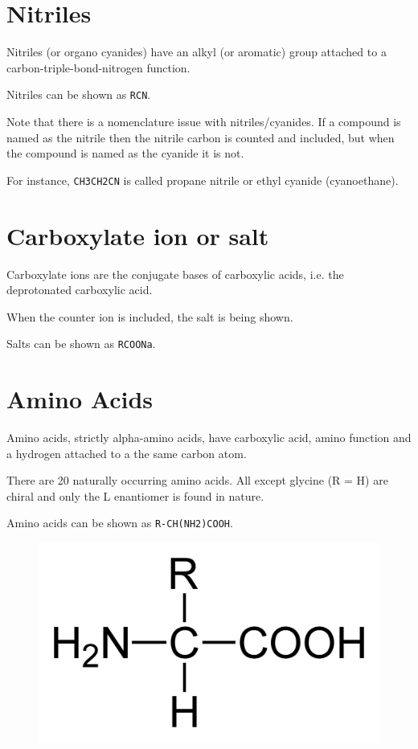 \documentclass[oneside]{book}
\begin{document}
\section{Nitriles}
Nitriles (or organo cyanides) have an alkyl (or aromatic) group attached to a
carbon-triple-bond-nitrogen function.

Nitriles can be shown as \texttt{RCN}.

Note that there is a nomenclature issue with nitriles/cyanides. If a compound is
named as the nitrile then the nitrile carbon is counted and included, but when
the compound is named as the cyanide it is not.

For instance, \texttt{CH3CH2CN} is called propane nitrile or ethyl cyanide
(cyanoethane).

\section{Carboxylate ion or salt}
Carboxylate ions are the conjugate bases of carboxylic acids, i.e. the
deprotonated carboxylic acid.

When the counter ion is included, the salt is being shown.

Salts can be shown as \texttt{RCOONa}.

\section{Amino Acids}
Amino acids, strictly alpha-amino acids, have carboxylic acid, amino function
and a hydrogen attached to a the same carbon atom.

There are 20 naturally occurring amino acids. All except glycine (R = H) are
chiral and only the L enantiomer is found in nature.

Amino acids can be shown as \texttt{R-CH(NH2)COOH}.

\begin{figure}[ht]
\includegraphics[scale=0.125]{alpha-amino-acid-flat.png}
\centering
\end{figure}
\end{document}
